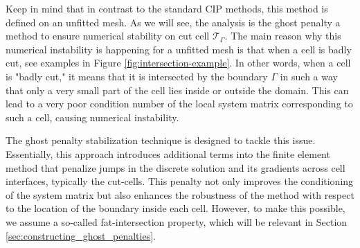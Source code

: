 Keep in mind that in contrast to the standard CIP methods, this method is defined on an unfitted mesh. As we will see, the analysis is the ghost penalty a method to ensure numerical stability on cut cell $\mathcal{T} _{\Gamma }$. The main reason why
this numerical instability is happening for a unfitted mesh is that when a cell is badly cut, see examples in Figure \ref{fig:intersection-example}.
In other words, when a cell is "badly cut," it means that it is intersected by the boundary $\Gamma$ in such a way that only a very small part of the cell lies inside or outside the domain. This can lead to a very poor condition number of the local system matrix corresponding to such a cell, causing numerical instability.

The ghost penalty stabilization technique is designed to tackle this issue. Essentially, this approach introduces additional terms into the finite element method that penalize jumps in the discrete solution and its gradients across cell interfaces,
typically the cut-cells. This penalty not only improves the conditioning of the system matrix but also enhances the robustness of the method with respect to the location of the boundary inside each cell. However, to make this possible, we assume a
so-called fat-intersection property, which will be relevant in Section \ref{sec:constructing_ghost_penalties}.

